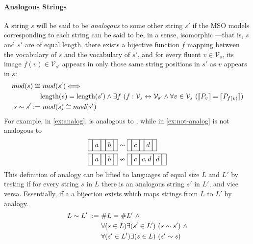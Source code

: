 \documentclass[a4paper,12pt,leqno,twoside]{article}
\newcommand{\vph}[1]{\vphantom{#1}}
\newcommand{\ebox}[1]{\fbox{$\vph{'(),}#1$}}
\newcommand{\nbBefore}[2]{\ebox{#1}\ebox{}\ebox{#2}}
\newcommand{\nbOverlaps}[2]{\ebox{#1}\ebox{#1,#2}\ebox{#2}}
\newcommand{\Before}[2]{\ebox{}\nbBefore{#1}{#2}\ebox{}}
\newcommand{\Overlaps}[2]{\ebox{}\nbOverlaps{#1}{#2}\ebox{}}
\newcommand{\V}{\mathcal{V}}
\newcommand{\nb}[1]{{\color{red}[NB\footnote{{\color{red}#1}}]}}
\begin{document}
\paragraph{Analogous Strings}\label{para:analogous-strings}
A string $s$ will be said to be \textit{analogous} to some other string $s'$ if the MSO models corresponding to each string can be said to be, in a sense, isomorphic%
---that is, $s$ and $s'$ are of equal length, there exists a bijective function $f$ mapping between the vocabulary of $s$ and the vocabulary of $s'$, and for every fluent $v \in \V_s$, its image $f(v) \in \V_{s'}$ appears in only those same string positions in $s'$ as $v$ appears in $s$:
\begin{align}\label{def:analogous-strings}
	mod(s) \cong&~ mod(s') \Longleftrightarrow \\\notag &\text{length}(s) = \text{length}(s') \land \exists f ~(f: \V_s \leftrightarrow \V_{s'} \land \forall v \in \V_s ~(\llbracket P_v \rrbracket = \llbracket P_{f(v)} \rrbracket)\\
	s \sim s' :=&~ mod(s) \cong mod(s')
\end{align}
For example, in \cref{ex:analog}, \Before{a}{b} is analogous to \Before{c}{d}, while in \cref{ex:not-analog} \Before{a}{b} is not analogous to \Overlaps{c}{d}
\begin{align}
	\Before{a}{b} &\sim \Before{c}{d}\label{ex:analog}\\
	\Before{a}{b} &\nsim \Overlaps{c}{d}\label{ex:not-analog}
\end{align}
This definition of analogy can be lifted to languages of equal size $L$ and $L'$ by testing if for every string $s$ in $L$ there is an analogous string $s'$ in $L'$, and vice versa. Essentially, if a a bijection exists which maps strings from $L$ to $L'$ by analogy.
\begin{align}\label{def:analogous-languages}
	L \sim L' ~:=~ &\# L = \#L' ~\wedge\\\notag&\forall (s \in L) \exists (s' \in L')~ (s \sim s') ~\wedge\\\notag&\forall (s' \in L') \exists (s \in L)~ (s' \sim s)
\end{align}
\end{document}
